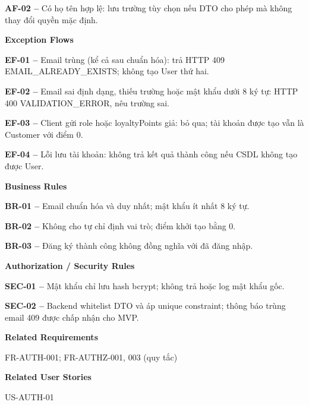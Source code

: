 \documentclass[11pt,a4paper,oneside]{report}
\begin{document}
\textbf{AF-02 --} Có họ tên hợp lệ: lưu trường tùy chọn nếu DTO cho phép mà không thay đổi quyền mặc định.
\par

\par\smallskip\noindent\textcolor{sgublue}{\textbf{Exception Flows}}\par\nobreak
\textbf{EF-01 --} Email trùng (kể cả sau chuẩn hóa): trả HTTP 409 EMAIL\_ALREADY\_EXISTS; không tạo User thứ hai.

\textbf{EF-02 --} Email sai định dạng, thiếu trường hoặc mật khẩu dưới 8 ký tự: HTTP 400 VALIDATION\_ERROR, nêu trường sai.

\textbf{EF-03 --} Client gửi role hoặc loyaltyPoints giả: bỏ qua; tài khoản được tạo vẫn là Customer với điểm 0.

\textbf{EF-04 --} Lỗi lưu tài khoản: không trả kết quả thành công nếu CSDL không tạo được User.
\par

\par\smallskip\noindent\textcolor{sgublue}{\textbf{Business Rules}}\par\nobreak
\textbf{BR-01 --} Email chuẩn hóa và duy nhất; mật khẩu ít nhất 8 ký tự.

\textbf{BR-02 --} Không cho tự chỉ định vai trò; điểm khởi tạo bằng 0.

\textbf{BR-03 --} Đăng ký thành công không đồng nghĩa với đã đăng nhập.
\par

\par\smallskip\noindent\textcolor{sgublue}{\textbf{Authorization / Security Rules}}\par\nobreak
\textbf{SEC-01 --} Mật khẩu chỉ lưu hash bcrypt; không trả hoặc log mật khẩu gốc.

\textbf{SEC-02 --} Backend whitelist DTO và áp unique constraint; thông báo trùng email 409 được chấp nhận cho MVP.
\par

\par\smallskip\noindent\textcolor{sgublue}{\textbf{Related Requirements}}\par\nobreak
FR-AUTH-001; FR-AUTHZ-001, 003 (quy tắc)
\par

\par\smallskip\noindent\textcolor{sgublue}{\textbf{Related User Stories}}\par\nobreak
US-AUTH-01
\par
\end{document}

